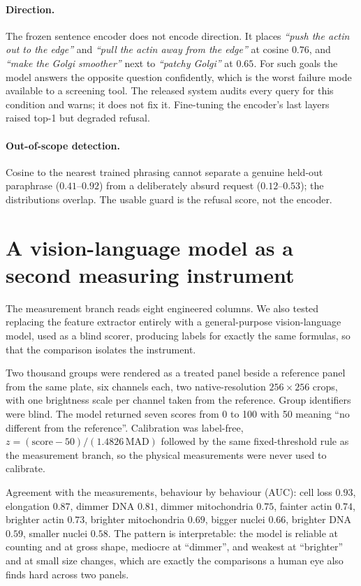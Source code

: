 \documentclass[11pt]{article}
\newcommand{\goal}[1]{\textit{``#1''}}
\begin{document}
\paragraph{Direction.} The frozen sentence encoder does not encode direction. It places
\goal{push the actin out to the edge} and \goal{pull the actin away from the edge} at
cosine $0.76$, and \goal{make the Golgi smoother} next to \goal{patchy Golgi} at $0.65$.
For such goals the model answers the opposite question confidently, which is the worst
failure mode available to a screening tool. The released system audits every query for
this condition and warns; it does not fix it. Fine-tuning the encoder's last layers
raised top-1 but degraded refusal.

\paragraph{Out-of-scope detection.} Cosine to the nearest trained phrasing cannot
separate a genuine held-out paraphrase ($0.41$--$0.92$) from a deliberately absurd
request ($0.12$--$0.53$); the distributions overlap. The usable guard is the refusal
score, not the encoder.

\section{A vision-language model as a second measuring instrument}
\label{sec:vlm}

The measurement branch reads eight engineered columns. We also tested replacing the
feature extractor entirely with a general-purpose vision-language model, used as a blind
scorer, producing labels for exactly the same formulas, so that the comparison isolates
the instrument.

Two thousand groups were rendered as a treated panel beside a reference panel from the
same plate, six channels each, two native-resolution $256\times256$ crops, with one
brightness scale per channel taken from the reference. Group identifiers were blind. The
model returned seven scores from 0 to 100 with 50 meaning ``no different from the
reference''. Calibration was label-free, $z = (\text{score}-50)/(1.4826\,\text{MAD})$
followed by the same fixed-threshold rule as the measurement branch, so the physical
measurements were never used to calibrate.

Agreement with the measurements, behaviour by behaviour (AUC): cell loss $0.93$,
elongation $0.87$, dimmer DNA $0.81$, dimmer mitochondria $0.75$, fainter actin $0.74$,
brighter actin $0.73$, brighter mitochondria $0.69$, bigger nuclei $0.66$, brighter DNA
$0.59$, smaller nuclei $0.58$. The pattern is interpretable: the model is reliable at
counting and at gross shape, mediocre at ``dimmer'', and weakest at ``brighter'' and at
small size changes, which are exactly the comparisons a human eye also finds hard across
two panels.
\end{document}
